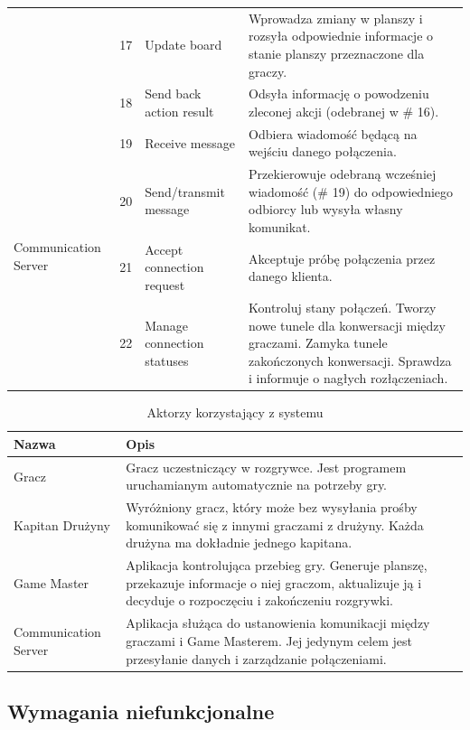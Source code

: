 \documentclass[11pt]{article}
\let\Oldsubsection\subsection
\renewcommand{\subsection}{\FloatBarrier\Oldsubsection}
\begin{document}
\begin{longtable}{|p{}|p{}|p{}|p{}|}
& 17
& Update board
& Wprowadza zmiany w planszy i rozsyła odpowiednie informacje o stanie planszy przeznaczone dla graczy.
\\ \cline{2-4}
& 18
& Send back action result
& Odsyła informację o powodzeniu zleconej akcji (odebranej w \# 16).
\\ \hline
\multirow{4}{.20\textwidth}{Communication Server}
& 19
& Receive message
& Odbiera wiadomość będącą na wejściu danego połączenia.
\\ \cline{2-4}
& 20
& Send/transmit message
& Przekierowuje odebraną wcześniej wiadomość (\# 19) do odpowiedniego odbiorcy lub wysyła własny komunikat.
\\ \cline{2-4}
& 21
& Accept connection request
& Akceptuje próbę połączenia przez danego klienta.
\\ \cline{2-4}
& 22
& Manage connection statuses
& Kontroluj stany połączeń. Tworzy nowe tunele dla konwersacji między graczami. Zamyka tunele zakończonych konwersacji. Sprawdza i informuje o nagłych rozłączeniach.
\\ \hline
\end{longtable}
\FloatBarrier

\begin{longtable}[!h]{|p{}|p{}|}
\caption{Aktorzy korzystający z systemu}
\\ \hline
Nazwa 
& Opis 
\\ \hline
Gracz 
& Gracz uczestniczący w rozgrywce. Jest programem uruchamianym automatycznie na potrzeby gry. 
\\ \hline
Kapitan Drużyny 
& Wyróżniony gracz, który może bez wysyłania prośby komunikować się z innymi graczami z drużyny. Każda drużyna ma dokładnie jednego kapitana. 
\\ \hline
Game Master
& Aplikacja kontrolująca przebieg gry. Generuje planszę, przekazuje informacje o niej graczom, aktualizuje ją i decyduje o rozpoczęciu i zakończeniu rozgrywki.
\\ \hline
Communication Server
& Aplikacja służąca do ustanowienia komunikacji między graczami i Game Masterem. Jej jedynym celem jest przesyłanie danych i zarządzanie połączeniami.
\\ \hline
\end{longtable}
\FloatBarrier

\subsection{Wymagania niefunkcjonalne}
\par
\end{document}
